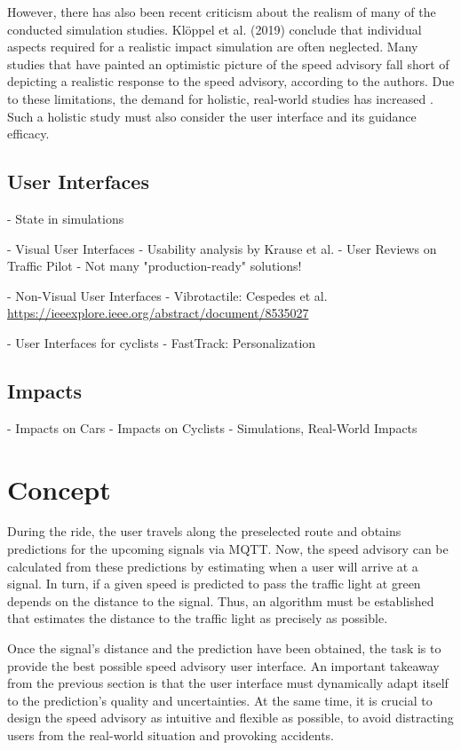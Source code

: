 However, there has also been recent criticism about the realism of many of the conducted simulation studies. Klöppel et al. (2019) \cite{kloeppel_performance_2019} conclude that individual aspects required for a realistic impact simulation are often neglected. Many studies that have painted an optimistic picture of the speed advisory fall short of depicting a realistic response to the speed advisory, according to the authors. Due to these limitations, the demand for holistic, real-world studies has increased \cite{stahlmann_exploring_2018}. Such a holistic study must also consider the user interface and its guidance efficacy. 

\subsection{User Interfaces}

- State in simulations

- Visual User Interfaces
- Usability analysis by Krause et al.
- User Reviews on Traffic Pilot
- Not many "production-ready" solutions!

- Non-Visual User Interfaces
- Vibrotactile: Cespedes et al. \url{https://ieeexplore.ieee.org/abstract/document/8535027}

- User Interfaces for cyclists
- FastTrack: Personalization

\subsection{Impacts}

- Impacts on Cars
- Impacts on Cyclists
- Simulations, Real-World Impacts

\section{Concept}

During the ride, the user travels along the preselected route and obtains predictions for the upcoming signals via MQTT. Now, the speed advisory can be calculated from these predictions by estimating when a user will arrive at a signal. In turn, if a given speed is predicted to pass the traffic light at green depends on the distance to the signal. Thus, an algorithm must be established that estimates the distance to the traffic light as precisely as possible.

Once the signal's distance and the prediction have been obtained, the task is to provide the best possible speed advisory user interface. An important takeaway from the previous section is that the user interface must dynamically adapt itself to the prediction's quality and uncertainties. At the same time, it is crucial to design the speed advisory as intuitive and flexible as possible, to avoid distracting users from the real-world situation and provoking accidents.

